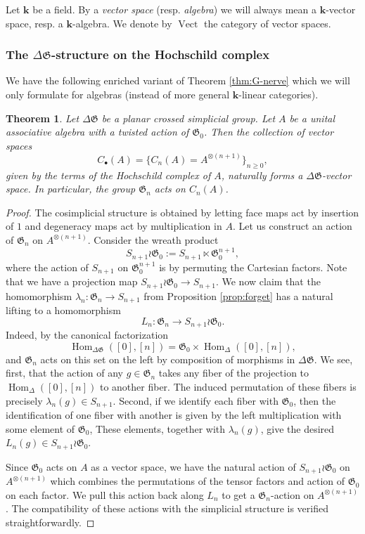 \documentclass[english,11pt,leqno]{article}
\def\Gen{\mathfrak{G}}
\def\Hom{\operatorname{Hom}}
\def\Vect{\operatorname{Vect}}
\def\lra{\longrightarrow}
\def\k{\mathbf{k}}
\def\Hom{\operatorname{Hom}}
\def\DG{ {\Delta \Gen}}
\newtheorem{thm}{Theorem}[section]
\theoremstyle{definition}
\theoremstyle{remark}
\numberwithin{equation}{section}
\begin{document}
Let $\k$ be a field. By a {\em vector space} (resp. {\em algebra}) we will always mean a $\k$-vector
space, resp. a $\k$-algebra. We denote by $\Vect$ the category of vector spaces.

\subsubsection{The $\DG$-structure on the Hochschild complex}

We have the following enriched variant of Theorem \ref{thm:G-nerve} which we will only formulate
for algebras (instead of more general $\k$-linear categories).

\begin{thm}\label{thm:hochschild}
Let $\DG$ be a planar crossed simplicial group. Let $A$ be a unital associative algebra with a 
twisted action of $\Gen_0$. Then the collection of vector spaces
  \[
 C_\bullet(A) =   \bigl\{ C_n(A) = A^{\otimes (n+1)}\bigr\}_{n\geq 0},
  \]
given by the terms of the Hochschild complex of $A$, naturally forms a $\Delta\Gen$-vector space. 
In particular, the group $\Gen_n$ acts on $C_n(A)$. 
\end{thm}
\begin{proof}
The cosimplicial structure is obtained by letting face maps act by insertion of $1$ and degeneracy
maps act by multiplication in $A$. Let us construct an action of $\Gen_n$  on $A^{\otimes (n+1)}$.
Consider the wreath product
\[
S_{n+1}\wr \Gen_0 := S_{n+1}\ltimes \Gen_0^{n+1},
\]
where the action of $S_{n+1}$ on $\Gen_0^{n+1}$ is by permuting the Cartesian factors. 
Note that we have a projection map $S_{n+1}\wr\Gen_0 \to S_{n+1}$. We now claim that the
homomorphism $\lambda_n: \Gen_n\to S_{n+1}$ from Proposition \ref{prop:forget} has a natural lifting
to a homomorphism
\[
L_n: \Gen_n \lra S_{n+1}\wr \Gen_0. 
\]
Indeed, by the canonical factorization
\[
\Hom_\DG([0], [n]) = \Gen_0 \times\Hom_\Delta([0], [n]),
\]
and $\Gen_n$ acts on this set on the left by composition of morphisms in $\DG$.  We see, first,
that the action of any $g\in\Gen_n$ takes any fiber of the projection to $\Hom_\Delta([0], [n])$ to
another fiber. The induced permutation of these fibers is precisely $\lambda_n(g)\in S_{n+1}$.
Second, if we identify each fiber with $\Gen_0$, then the identification of one fiber with another
is given by the left multiplication with some element of $\Gen_0$, These elements, together with
$\lambda_n(g)$, give the desired $L_n(g)\in S_{n+1}\wr \Gen_0$. 

Since $\Gen_0$ acts on $A$ as a vector space, we have the natural action of $S_{n+1}\wr\Gen_0$ on
$A^{\otimes(n+1)}$ which combines the permutations of the tensor factors and action of $\Gen_0$ on
each factor. We pull this action back along $L_n$ to get a $\Gen_n$-action on $A^{\otimes(n+1)}$.
The compatibility of these actions with the simplicial structure is verified straightforwardly. 
\end{proof}
\end{document}
